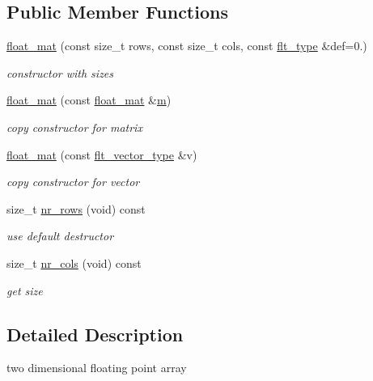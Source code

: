 \subsection*{Public Member Functions}
\begin{DoxyCompactItemize}
\item 
\hyperlink{classIceBRG_1_1sgsmooth_1_1float__mat_aadcf2088badc653044d76db9fa92c8f6}{float\+\_\+mat} (const size\+\_\+t rows, const size\+\_\+t cols, const \hyperlink{lib_2IceBRG__main_2common_8h_ad0f130a56eeb944d9ef2692ee881ecc4}{flt\+\_\+type} \&def=0.)
\begin{DoxyCompactList}\small\item\em constructor with sizes \end{DoxyCompactList}\item 
\hyperlink{classIceBRG_1_1sgsmooth_1_1float__mat_a0b8a9a2f6c0cde0981937ea074ddbf26}{float\+\_\+mat} (const \hyperlink{classIceBRG_1_1sgsmooth_1_1float__mat}{float\+\_\+mat} \&\hyperlink{namespaceIceBRG_ada6365c5d16106f0608afbd34f010bcc}{m})
\begin{DoxyCompactList}\small\item\em copy constructor for matrix \end{DoxyCompactList}\item 
\hyperlink{classIceBRG_1_1sgsmooth_1_1float__mat_a6534c2f7d23dc74f143d737eaff9966a}{float\+\_\+mat} (const \hyperlink{lib_2IceBRG__main_2common_8h_ab7b04bb475996b18d7653bb03d72f2c6}{flt\+\_\+vector\+\_\+type} \&v)
\begin{DoxyCompactList}\small\item\em copy constructor for vector \end{DoxyCompactList}\item 
size\+\_\+t \hyperlink{classIceBRG_1_1sgsmooth_1_1float__mat_a529d1c4e6c3099d1605a210e9af15d27}{nr\+\_\+rows} (void) const 
\begin{DoxyCompactList}\small\item\em use default destructor \end{DoxyCompactList}\item 
size\+\_\+t \hyperlink{classIceBRG_1_1sgsmooth_1_1float__mat_aefce21794625942d8be758522644d1c1}{nr\+\_\+cols} (void) const 
\begin{DoxyCompactList}\small\item\em get size \end{DoxyCompactList}\end{DoxyCompactItemize}


\subsection{Detailed Description}
two dimensional floating point array 

